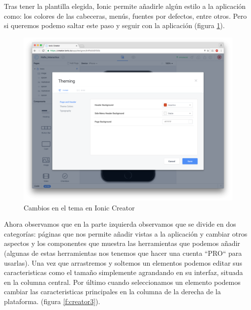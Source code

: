 \documentclass[a4paper, 11pt]{article}
\begin{document}
\begin{itemize}
               Tras tener la plantilla elegida, Ionic permite añadirle algún
               estilo a la aplicación como: los colores de las cabeceras, menús,
               fuentes por defectos, entre otros. Pero si queremos podemo saltar
               este paso y seguir con la aplicación (figura \ref{f:creator2}).\\

               \begin{figure}[H]
                 \centering
                      \includegraphics[width=\textwidth]{creator2}
                      \caption{Cambios en el tema en Ionic Creator}
                      \label{f:creator2}
                \end{figure}

                Ahora observamos que en la parte izquierda observamos que se
                divide en dos categorías: páginas que nos permite añadir vistas
                a la aplicación y cambiar otros aspectos y los componentes que
                muestra las herramientas que podemos añadir (algunas de estas
                herramientas nos tenemos que hacer una cuenta ``PRO`` para
                usarlas). Una vez que arrastremos y soltemos un elementos podemos
                editar sus caracteristicas como el tamaño simplemente agrandando
                en su interfaz, situada en la columna central. Por último cuando
                seleccionamos un elemento podemos cambiar las caracteristicas
                principales en la columna de la derecha de la plataforma. (figura
                \ref{f:creator3}).\\


\end{itemize}
\end{document}
